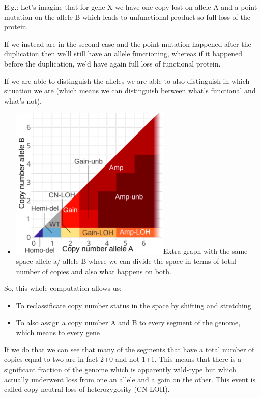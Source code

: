 E.g.: Let's imagine that for gene X we have one copy lost on allele A and a
point mutation on the allele B which leads to unfunctional product so full loss
of the protein.

If we instead are in the second case and the point mutation happened after the
duplication then we'll still have an allele functioning, whereas if it happened
before the duplication, we'd have again full loss of functional protein.

If we are able to distinguish the alleles we are able to also distinguish in
which situation we are (which means we can distinguish between what's functional
and what's not).

\begin{itemize}
\item
  \includegraphics[width=3.00903in,height=2.89861in]{image13.png}Extra graph
  with the same space allele a/ allele B where we can divide the space in terms
  of total number of copies and also what happens on both.
\end{itemize}

So, this whole computation allows us:

\begin{itemize}
\item
  To reclassificate copy number status in the space by shifting and stretching
\item
  To also assign a copy number A and B to every segment of the genome, which
  means to every gene
\end{itemize}

If we do that we can see that many of the segments that have a total number of
copies equal to two are in fact 2+0 and not 1+1. This means that there is a
significant fraction of the genome which is apparently wild-type but which
actually underwent loss from one an allele and a gain on the other. This event
is called copy-neutral loss of heterozygosity (CN-LOH).

